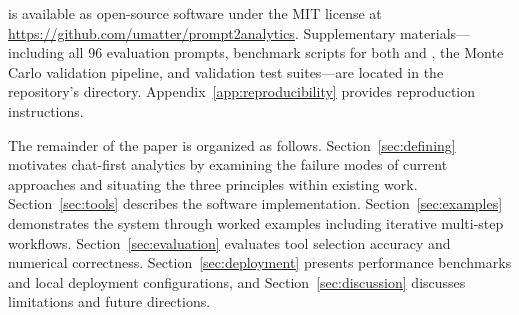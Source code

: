  is available as open-source software under the MIT
license at \url{https://github.com/umatter/prompt2analytics}.
Supplementary materials---including all 96 evaluation prompts,
benchmark scripts for both  and , the Monte
Carlo validation pipeline, and validation test suites---are located in
the repository's  directory.
Appendix~\ref{app:reproducibility} provides reproduction instructions.

The remainder of the paper is organized as follows.
Section~\ref{sec:defining} motivates chat-first analytics by
examining the failure modes of current approaches and situating the
three principles within existing work.
Section~\ref{sec:tools} describes the software implementation.
Section~\ref{sec:examples} demonstrates the system through worked
examples including iterative multi-step workflows.
Section~\ref{sec:evaluation} evaluates tool selection accuracy and
numerical correctness.
Section~\ref{sec:deployment} presents performance benchmarks and local
deployment configurations, and Section~\ref{sec:discussion} discusses
limitations and future directions.
